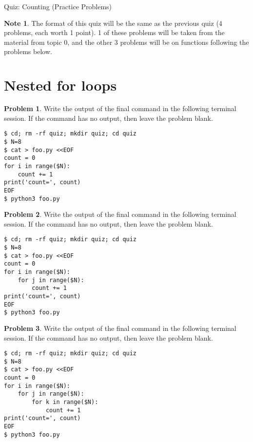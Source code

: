 \documentclass[10pt]{article}
\theoremstyle{definition}
\newtheorem{problem}{Problem}
\newtheorem{note}{Note}
\begin{document}
\begin{center}
    {
\Large
    Quiz: Counting (Practice Problems)
}

    \vspace{0.1in}
\end{center}

\vspace{0.15in}
\noindent
\begin{note}
The format of this quiz will be the same as the previous quiz (4 problems, each worth 1 point).
1 of these problems will be taken from the material from topic 0,
and the other 3 problems will be on functions following the problems below.
\end{note}
\vspace{0.15in}

\section{Nested for loops}

\filbreak
\begin{problem}
    Write the output of the final command in the following terminal session.
    If the command has no output, then leave the problem blank.
\end{problem}
\begin{lstlisting}
$ cd; rm -rf quiz; mkdir quiz; cd quiz
$ N=8
$ cat > foo.py <<EOF
count = 0
for i in range($N):
    count += 1
print('count=', count)
EOF
$ python3 foo.py
\end{lstlisting}
\vspace{0.4in}

\filbreak
\begin{problem}
    Write the output of the final command in the following terminal session.
    If the command has no output, then leave the problem blank.
\end{problem}
\begin{lstlisting}
$ cd; rm -rf quiz; mkdir quiz; cd quiz
$ N=8
$ cat > foo.py <<EOF
count = 0
for i in range($N):
    for j in range($N):
        count += 1
print('count=', count)
EOF
$ python3 foo.py
\end{lstlisting}
\vspace{0.4in}

\filbreak
\begin{problem}
    Write the output of the final command in the following terminal session.
    If the command has no output, then leave the problem blank.
\end{problem}
\begin{lstlisting}
$ cd; rm -rf quiz; mkdir quiz; cd quiz
$ N=8
$ cat > foo.py <<EOF
count = 0
for i in range($N):
    for j in range($N):
        for k in range($N):
            count += 1
print('count=', count)
EOF
$ python3 foo.py
\end{lstlisting}
\vspace{0.1in}
\end{document}

